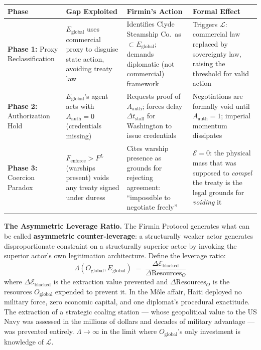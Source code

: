 \begin{center}
\begin{tabular}{p{2.2cm} p{4.2cm} p{4.2cm} p{3.2cm}}
\hline
\textbf{Phase} & \textbf{Gap Exploited} & \textbf{Firmin's Action} & \textbf{Formal Effect} \\
\hline
\textbf{Phase 1:} Proxy Reclassification & $E_{\text{global}}$ uses commercial proxy to disguise state action, avoiding treaty law & Identifies Clyde Steamship Co.\ as $\subset E_{\text{global}}$; demands diplomatic (not commercial) framework & Triggers $\mathcal{L}$: commercial law replaced by sovereignty law, raising the threshold for valid action \\[8pt]
\textbf{Phase 2:} Authorization Hold & $E_{\text{global}}$'s agent acts with $A_{\text{auth}} = 0$ (credentials missing) & Requests proof of $A_{\text{auth}}$; forces delay $\Delta t_{\text{stall}}$ for Washington to issue credentials & Negotiations are formally void until $A_{\text{auth}} = 1$; imperial momentum dissipates \\[8pt]
\textbf{Phase 3:} Coercion Paradox & $F_{\text{enforce}} > F^L$ (warships present) voids any treaty signed under duress & Cites warship presence as grounds for rejecting agreement: ``impossible to negotiate freely'' & $\mathcal{E} = 0$: the physical mass that was supposed to \textit{compel} the treaty is the legal grounds for \textit{voiding} it \\
\hline
\end{tabular}
\end{center}

\textbf{The Asymmetric Leverage Ratio.} The Firmin Protocol generates what can be called \textbf{asymmetric counter-leverage}: a structurally weaker actor generates disproportionate constraint on a structurally superior actor by invoking the superior actor's own legitimation architecture. Define the leverage ratio:
\begin{equation}\label{eq:13.10-asymmetric-leverage-ratio}
\Lambda(O_{\text{global}}, E_{\text{global}}) \;=\; \frac{\Delta\mathcal{E}_{\text{blocked}}}{\Delta\text{Resources}_{O}}
\end{equation}
where $\Delta\mathcal{E}_{\text{blocked}}$ is the extraction value prevented and $\Delta\text{Resources}_{O}$ is the resources $O_{\text{global}}$ expended to prevent it. In the Môle affair, Haiti deployed no military force, zero economic capital, and one diplomat's procedural exactitude. The extraction of a strategic coaling station --- whose geopolitical value to the US Navy was assessed in the millions of dollars and decades of military advantage --- was prevented entirely. $\Lambda \to \infty$ in the limit where $O_{\text{global}}$'s only investment is knowledge of $\mathcal{L}$.

